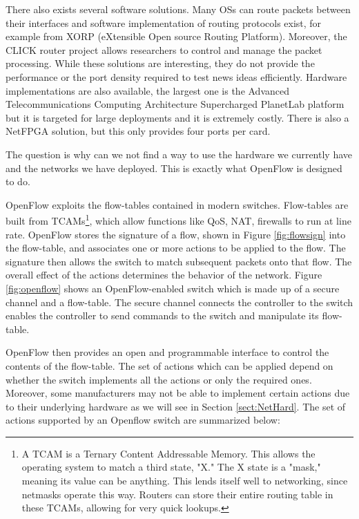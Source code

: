 There also exists several software solutions. Many OSs can route packets between
their interfaces and software implementation of routing protocols exist, for
example from XORP \cite{XORP} (eXtensible Open source Routing Platform).
Moreover, the CLICK \cite{CLICK} router project allows researchers to control
and manage the packet processing. While these solutions are interesting, they
do not provide the performance  or the port density required to test news ideas
efficiently. Hardware implementations are also available, the largest one is the
Advanced Telecommunications Computing Architecture Supercharged PlanetLab
platform \cite{PlanetLab} but it is targeted for large deployments and it is
extremely costly. There is also a NetFPGA \cite{NETFPGA} solution, but this
only provides four ports per card.

The question is why can we not find a way to use the hardware we
currently have and the networks we have deployed. This is exactly what OpenFlow
is designed to do.



OpenFlow exploits the flow-tables contained in modern switches. Flow-tables are
built from TCAMs\footnote{A TCAM is a Ternary Content Addressable Memory. This
allows the operating system to match a third state, "X." The X state is a
"mask," meaning its value can be anything. This lends itself well to networking,
since netmasks operate this way. Routers can store their entire routing table in
these TCAMs, allowing for very quick lookups.}, which allow functions like QoS,
NAT, firewalls to run at line rate. OpenFlow stores the signature of a flow,
shown in Figure \ref{fig:flowsign} into the flow-table, and associates one or
more actions to be applied to the flow. The signature then allows the switch
to match subsequent packets onto that flow. The overall effect of the actions 
determines the behavior of the network. Figure \ref{fig:openflow} shows an
OpenFlow-enabled switch which is made up of a secure channel and a flow-table.
The secure channel connects the controller to the switch enables the controller
to send commands to the switch and manipulate its flow-table.


OpenFlow then provides an open and programmable interface to control the
contents of the flow-table. The set of actions which can be applied depend on whether
the switch implements all the actions or only the required ones. Moreover,
some manufacturers may not be able to implement certain actions due to their
underlying hardware as we will see in Section \ref{sect:NetHard}. The set of 
actions supported by an Openflow switch are summarized below:

